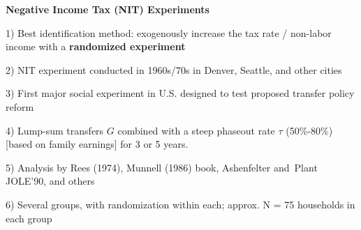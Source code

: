 \documentclass[landscape]{slides}
\begin{document}
\begin{slide}
\begin{center}
{\bf Negative Income Tax (NIT) Experiments}
\end{center}

1) Best identification method: exogenously
increase the tax rate / non-labor income with a {\bf randomized experiment}

2)  NIT experiment conducted in 1960s/70s in Denver, Seattle, and
other cities

3) First major social experiment in U.S. designed to test proposed
transfer policy reform

4) Lump-sum transfers $G$ combined with a steep
phaseout rate $\tau $ (50\%-80\%) [based on family earnings] for 3 or 5 years.

5) Analysis by Rees (1974), Munnell (1986) book, Ashenfelter and\
Plant JOLE'90, and others

6) Several groups, with randomization within each; approx. N = 75
households in each group
\end{slide}

\begin{slide}

\end{slide}

\begin{slide}

\end{slide}

%
%
%
%
%
%
\end{document}
